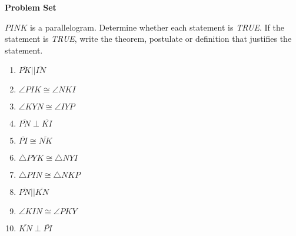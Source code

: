 \textbf{Problem Set}

$PINK$ is a parallelogram. Determine whether each statement is \emph{TRUE}. If the statement is \emph{TRUE}, write the theorem, postulate or definition that justifies the statement.
{\begin{enumerate}[label = \arabic*. ]
\item $\overline{PK} || \overline{IN}$ 
\item $\angle{PIK} \cong \angle{NKI}$ 
\item $\angle{KYN} \cong \angle{IYP}$ 
\item $\overline{PN} \perp \overline{KI}$ 
\item $\overline{PI} \cong \overline{NK}$ 
\item $\triangle{PYK} \cong \triangle{NYI}$ 
\item $\triangle{PIN} \cong \triangle{NKP}$ 
\item $\overline{PN} || \overline{KN}$
\item $\angle{KIN} \cong \angle{PKY}$
\item $\overline{KN} \perp \overline{PI}$ 
\end{enumerate}}

\vspace*{-5ex}\hspace*{16em} 
